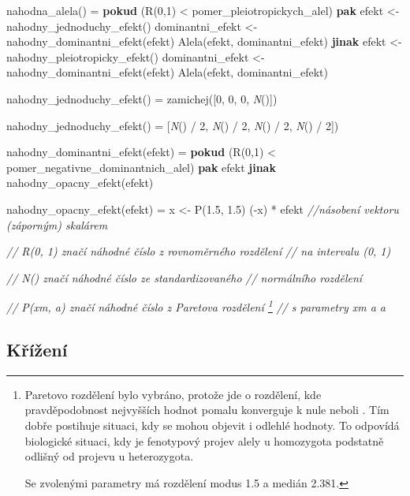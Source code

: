 \begin{tcolorbox}[ title={Pseudokód popisující generování náhodné alely}
                 , breakable
                 ]

\begin{code}[commandchars=\\\{\}]
nahodna_alela() =
    \textbf{pokud} (R(0,1) < pomer_pleiotropickych_alel)
        \textbf{pak}
            efekt <- nahodny_jednoduchy_efekt()
            dominantni_efekt <- nahodny_dominantni_efekt(efekt)
            Alela(efekt, dominantni_efekt)
        \textbf{jinak}
            efekt <- nahodny_pleiotropicky_efekt()
            dominantni_efekt <- nahodny_dominantni_efekt(efekt)
            Alela(efekt, dominantni_efekt)

nahodny_jednoduchy_efekt() =
    zamichej([0, 0, 0, \textit{N}()])

nahodny_jednoduchy_efekt() =
    [\textit{N}() / 2, \textit{N}() / 2, \textit{N}() / 2, \textit{N}() / 2])

nahodny_dominantni_efekt(efekt) =
    \textbf{pokud} (R(0,1) < pomer_negativne_dominantnich_alel)
        \textbf{pak} efekt
        \textbf{jinak} nahodny_opacny_efekt(efekt)

nahodny_opacny_efekt(efekt) =
    x <- P(1.5, 1.5)
    (-x) * efekt \textit{//násobení vektoru (záporným) skalárem}

\textit{// {R}(0, 1) značí náhodné číslo z rovnoměrného rozdělení}
\textit{//           na intervalu (0, 1)}

\textit{// {N}() značí náhodné číslo ze standardizovaného}
\textit{//       normálního rozdělení}

\textit{// {P}(xm, a) značí náhodné číslo z Paretova rozdělení \footnote{Paretovo rozdělení bylo vybráno, protože jde o rozdělení, kde pravděpodobnost nejvyšších hodnot pomalu konverguje k nule neboli . Tím  dobře postihuje situaci, kdy se mohou objevit i odlehlé hodnoty. To odpovídá biologické situaci, kdy je fenotypový projev alely u homozygota podstatně odlišný od projevu u heterozygota.

    Se zvolenými parametry má rozdělení modus 1.5 a medián 2.381.
    }
}
\textit{//            s parametry xm a a}
\end{code}
\end{tcolorbox}

\subsection{Křížení}

